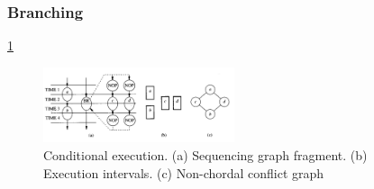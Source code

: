 \subsubsection{Branching}
\ref{fig:Conditional_execution}
\begin{figure}[h]
    \centering
    \includegraphics[width=0.5\textwidth]{Conditional_execution}
    \caption{ Conditional execution. (a) Sequencing graph fragment. (b) Execution intervals. (c) Non-chordal conflict 
graph \cite{b1}}
    \label{fig:Conditional_execution}
\end{figure}